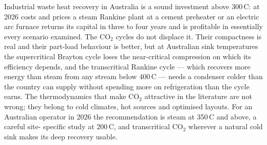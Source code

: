 \documentclass[12pt,a4paper]{report}
\begin{document}
Industrial waste heat recovery in Australia is a sound investment above
300\,\textdegree C: at 2026 costs and prices a steam Rankine plant at a
cement preheater or an electric arc furnace returns its capital in three to
four years and is profitable in essentially every scenario examined. The
CO$_2$ cycles do not displace it. Their compactness is real and their
part-load behaviour is better, but at Australian sink temperatures the
supercritical Brayton cycle loses the near-critical compression on which its
efficiency depends, and the transcritical Rankine cycle --- which recovers
more energy than steam from any stream below 400\,\textdegree C --- needs a
condenser colder than the country can supply without spending more on
refrigeration than the cycle earns. The thermodynamics that make CO$_2$
attractive in the literature are not wrong; they belong to cold climates,
hot sources and optimised layouts. For an Australian operator in 2026 the
recommendation is steam at 350\,\textdegree C and above, a careful site-
specific study at 200\,\textdegree C, and transcritical CO$_2$ wherever a
natural cold sink makes its deep recovery usable.
\renewcommand{\bibname}{References}
\end{document}
